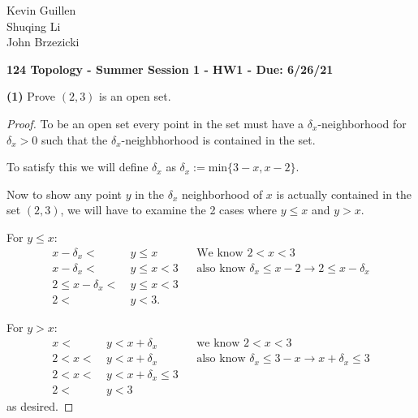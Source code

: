 \documentclass[12pt]{article}
\begin{document}
\begin{flushleft}
    Kevin Guillen\\ Shuqing Li \\ John Brzezicki 
\end{flushleft}
\begin{center}
    {\bf 124 Topology - Summer Session 1 - HW1 - Due: 6/26/21}
\end{center}

\noindent \textbf{ (1)} Prove $(2,3)$ is an open set.
\begin{proof}
    
    To be an open set every point in the set must have a $\delta_x$-neighborhood for $\delta_x > 0$ such that the $\delta_x$-neighbhorhood is contained in the set. 

    To satisfy this we will define $\delta_x$ as $\delta_x := \text{min}\{3-x,x-2\}$.

    Now to show any point $y$ in the $\delta_x$ neighborhood of $x$ is actually contained in the set $(2,3)$, we will have to examine the 2 cases where $y \leq x$ and $y > x$. 

    For $y \leq x$:
    \begin{align*}
        x - \delta_x <\ &y \leq x && \text{We know }2 < x < 3 \\
        x - \delta_x <\ &y \leq x < 3 && \text{also know } \delta_x \leq x-2 \rightarrow 2 \leq x-\delta_x \\
        2 \leq x - \delta_x <\ &y \leq x < 3 \\
        2 <\ &y < 3.
    \end{align*}

    For $y > x$:
    \begin{align*}
        x <\ &y < x+\delta_x && \text{we know } 2 < x < 3 \\
        2 < x <\ &y < x+\delta_x && \text{also know }  \delta_x \leq 3-x \rightarrow x + \delta_x \leq 3 \\
        2 < x <\ &y < x +\delta_x \leq 3 \\ 
        2 <\ &y < 3
    \end{align*} as desired.
\end{proof}
\end{document}
